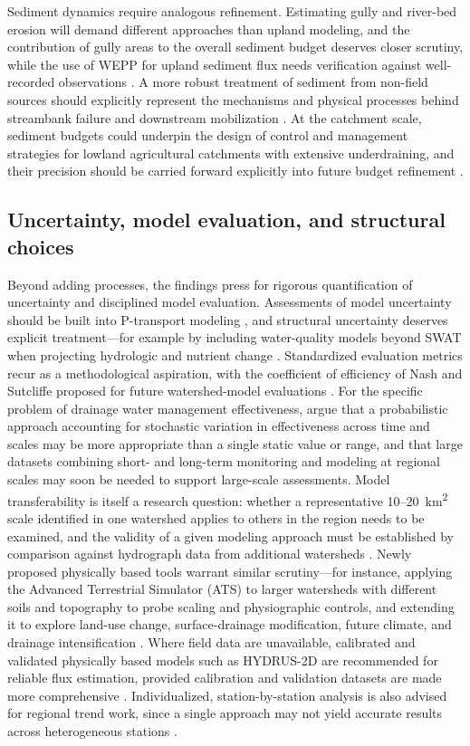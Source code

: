 \documentclass[11pt]{article}
\begin{document}
Sediment dynamics require analogous refinement. Estimating gully and river-bed erosion will demand different approaches than upland modeling, and the contribution of gully areas to the overall sediment budget deserves closer scrutiny, while the use of WEPP for upland sediment flux needs verification against well-recorded observations \parencite{Maalim2013}. A more robust treatment of sediment from non-field sources should explicitly represent the mechanisms and physical processes behind streambank failure and downstream mobilization \parencite{Dalzell2018}. At the catchment scale, sediment budgets could underpin the design of control and management strategies for lowland agricultural catchments with extensive underdraining, and their precision should be carried forward explicitly into future budget refinement \parencite{Walling2002}.

\subsection{Uncertainty, model evaluation, and structural choices}

Beyond adding processes, the findings press for rigorous quantification of uncertainty and disciplined model evaluation. Assessments of model uncertainty should be built into P-transport modeling \parencite{Wang2020b}, and structural uncertainty deserves explicit treatment---for example by including water-quality models beyond SWAT when projecting hydrologic and nutrient change \parencite{Kujawa2020}. Standardized evaluation metrics recur as a methodological aspiration, with the coefficient of efficiency of Nash and Sutcliffe proposed for future watershed-model evaluations \parencite{STONE1995,SAVABI1995}. For the specific problem of drainage water management effectiveness, \textcite{Shedekar2021} argue that a probabilistic approach accounting for stochastic variation in effectiveness across time and scales may be more appropriate than a single static value or range, and that large datasets combining short- and long-term monitoring and modeling at regional scales may soon be needed to support large-scale assessments. Model transferability is itself a research question: whether a representative 10--20~km\textsuperscript{2} scale identified in one watershed applies to others in the region needs to be examined, and the validity of a given modeling approach must be established by comparison against hydrograph data from additional watersheds \parencite{Basu2010}. Newly proposed physically based tools warrant similar scrutiny---for instance, applying the Advanced Terrestrial Simulator (ATS) to larger watersheds with different soils and topography to probe scaling and physiographic controls, and extending it to explore land-use change, surface-drainage modification, future climate, and drainage intensification \parencite{Rathore2025}. Where field data are unavailable, calibrated and validated physically based models such as HYDRUS-2D are recommended for reliable flux estimation, provided calibration and validation datasets are made more comprehensive \parencite{Naderi2025}. Individualized, station-by-station analysis is also advised for regional trend work, since a single approach may not yield accurate results across heterogeneous stations \parencite{Kumar2009}.
\end{document}
